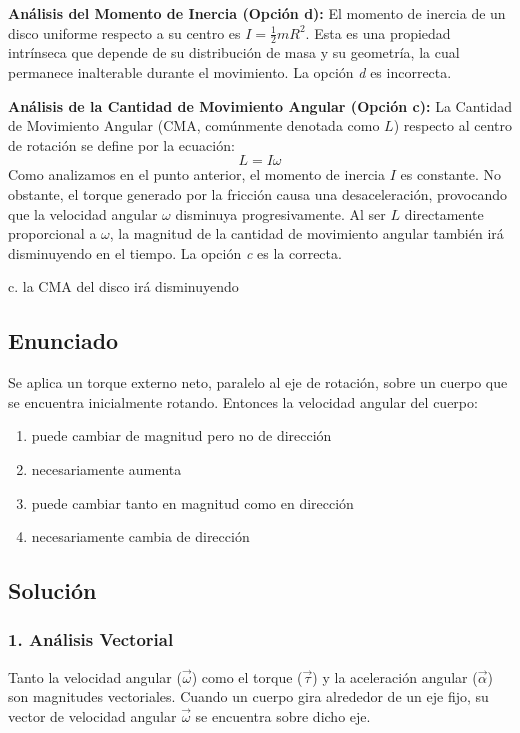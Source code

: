 \documentclass[12pt, a4paper]{article}
\begin{document}
\textbf{Análisis del Momento de Inercia (Opción d):}
El momento de inercia de un disco uniforme respecto a su centro es $I = \frac{1}{2}mR^2$. Esta es una propiedad intrínseca que depende de su distribución de masa y su geometría, la cual permanece inalterable durante el movimiento. La opción \textit{d} es incorrecta.

\textbf{Análisis de la Cantidad de Movimiento Angular (Opción c):}
La Cantidad de Movimiento Angular (CMA, comúnmente denotada como $L$) respecto al centro de rotación se define por la ecuación:
$$L = I \omega$$
Como analizamos en el punto anterior, el momento de inercia $I$ es constante. No obstante, el torque generado por la fricción causa una desaceleración, provocando que la velocidad angular $\omega$ disminuya progresivamente. Al ser $L$ directamente proporcional a $\omega$, la magnitud de la cantidad de movimiento angular también irá disminuyendo en el tiempo. La opción \textit{c} es la correcta.

\begin{tcolorbox}[colback=green!5!white, colframe=green!50!black, title=Respuesta Correcta]
\centering \Large c. la CMA del disco irá disminuyendo
\end{tcolorbox}

\newpage

\subsection*{Enunciado}
Se aplica un torque externo neto, paralelo al eje de rotación, sobre un cuerpo que se encuentra inicialmente rotando. Entonces la velocidad angular del cuerpo:
\begin{enumerate}[label=\alph*.]
    \item puede cambiar de magnitud pero no de dirección
    \item necesariamente aumenta
    \item puede cambiar tanto en magnitud como en dirección
    \item necesariamente cambia de dirección
\end{enumerate}

\subsection*{Solución}

\subsubsection*{1. Análisis Vectorial}
Tanto la velocidad angular ($\vec{\omega}$) como el torque ($\vec{\tau}$) y la aceleración angular ($\vec{\alpha}$) son magnitudes vectoriales. Cuando un cuerpo gira alrededor de un eje fijo, su vector de velocidad angular $\vec{\omega}$ se encuentra sobre dicho eje. 
\end{document}
